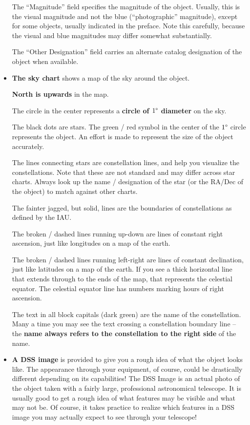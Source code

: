 \begin{itemize}
  The ``Magnitude'' field specifies the magnitude of the
  object. Usually, this is the visual magnitude and not the blue
  (``photographic'' magnitude), except for some objects, usually
  indicated in the preface. Note this carefully, because the visual
  and blue magnitudes may differ somewhat substantially.

  The ``Other Designation'' field carries an alternate catalog
  designation of the object when available.

\item \textbf{The sky chart} shows a map of the sky around the
  object.

  \textbf{North is upwards} in the map.
  
  The circle in the center represents a \textbf{circle of $1\degree$
    diameter} on the sky.

  The black dots are stars. The green / red symbol in the center of
  the $1\degree$ circle represents the object. An effort is made to
  represent the size of the object accurately.

  The lines connecting stars are constellation lines, and help you
  visualize the constellations. Note that these are not standard and
  may differ across star charts. Always look up the name / designation
  of the star (or the RA/Dec of the object) to match against other
  charts.

  The fainter jagged, but solid, lines are the boundaries of
  constellations as defined by the IAU.

  The broken / dashed lines running up-down are lines of constant
  right ascension, just like longitudes on a map of the earth.

  The broken / dashed lines running left-right are lines of constant
  declination, just like latitudes on a map of the earth. If you see a
  thick horizontal line that extends through to the ends of the map,
  that represents the celestial equator. The celestial equator line
  has numbers marking hours of right ascension.

  The text in all block capitals (dark green) are the name of the
  constellation. Many a time you may see the text crossing a
  constellation boundary line -- the \textbf{name always refers to the
    constellation to the right side} of the name.

\item \textbf{A DSS image} is provided to give you a rough idea of
  what the object looks like. The appearance through your equipment,
  of course, could be drastically different depending on its
  capabilities! The DSS Image is an actual photo of the object taken
  with a fairly large, professional astronomical telescope. It is
  usually good to get a rough idea of what features may be visible and
  what may not be. Of course, it takes practice to realize which
  features in a DSS image you may actually expect to see through your
  telescope!


\end{itemize}
